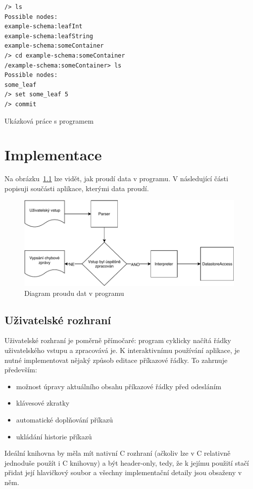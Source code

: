 \documentclass[thesis=B,czech,hidelinks]{FITthesis}[2019/03/06]
\newcommand{\Rplus}{\protect\hspace{-.1em}\protect\raisebox{.35ex}{\smaller{\smaller\textbf{+}}}}
\newcommand{\Cpp}{\mbox{C\Rplus\Rplus}\xspace}
\begin{document}
\begin{listing}
\begin{verbatim}
/> ls
Possible nodes:
example-schema:leafInt
example-schema:leafString
example-schema:someContainer
/> cd example-schema:someContainer
/example-schema:someContainer> ls
Possible nodes:
some_leaf
/> set some_leaf 5
/> commit
\end{verbatim}
\caption{Ukázková práce s programem}\label{ukazka:program}
\end{listing}


\chapter{Implementace}
Na obrázku~\ref{proud:dat} lze vidět, jak proudí data v programu. V následující části popisuji součásti aplikace, kterými data proudí.
\begin{figure}
\begin{center}
\includegraphics[width=.9\textwidth]{diagram}
\end{center}
\caption{Diagram proudu dat v programu}\label{proud:dat}
\end{figure}

\section{Uživatelské rozhraní}
Uživatelské rozhraní je poměrně přímočaré: program cyklicky načítá řádky uživatelského vstupu a zpracovává je. K interaktivnímu používání aplikace, je nutné implementovat nějaký způsob editace příkazové řádky. To zahrnuje především:
\begin{itemize}
    \item možnost úpravy aktuálního obsahu příkazové řádky před odesláním
    \item klávesové zkratky
    \item automatické doplňování příkazů
    \item ukládání historie příkazů
\end{itemize}
Ideální knihovna by měla mít nativní \Cpp{} rozhraní (ačkoliv lze v \Cpp{} relativně jednoduše použít i C knihovny) a být header-only, tedy, že k jejímu použití stačí přidat její hlavičkový soubor a všechny implementační detaily jsou obsaženy v něm.
\end{document}
